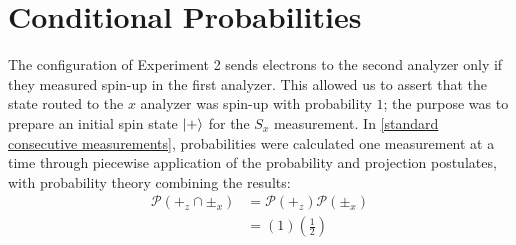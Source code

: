
\section{Conditional Probabilities}
The configuration of Experiment 2 sends electrons to the second analyzer only if they measured spin-up in the first analyzer. This allowed us to assert that the state routed to the $x$ analyzer was spin-up with probability $1$; the purpose was to prepare an initial spin state $\ket{+}$ for the $S_x$ measurement. In \autoref{standard consecutive measurements}, probabilities were calculated one measurement at a time through piecewise application of the probability and projection postulates, with probability theory combining the results:
\begin{align}
  \mathcal{P}(+_z \cap \pm_x) &= \mathcal{P}(+_z)\mathcal{P}(\pm_x) \\ \nonumber
  &= (1)\left(\frac{1}{2}\right)
\end{align}

